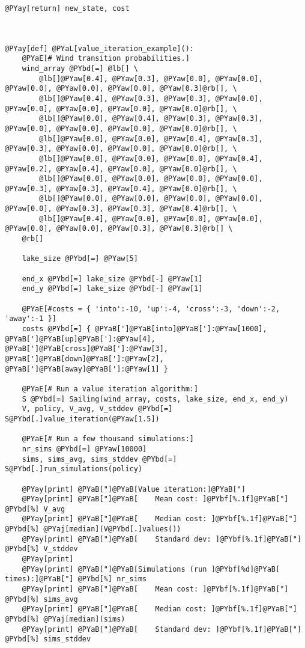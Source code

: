 \begin{Verbatim}[commandchars=@\[\]]
        @PYay[return] new_state, cost



@PYay[def] @PYaL[value_iteration_example]():
    @PYaE[# Wind transition probabilities.]
    wind_array @PYbd[=] @lb[] \
        @lb[]@PYaw[0.4], @PYaw[0.3], @PYaw[0.0], @PYaw[0.0], @PYaw[0.0], @PYaw[0.0], @PYaw[0.0], @PYaw[0.3]@rb[], \
        @lb[]@PYaw[0.4], @PYaw[0.3], @PYaw[0.3], @PYaw[0.0], @PYaw[0.0], @PYaw[0.0], @PYaw[0.0], @PYaw[0.0]@rb[], \
        @lb[]@PYaw[0.0], @PYaw[0.4], @PYaw[0.3], @PYaw[0.3], @PYaw[0.0], @PYaw[0.0], @PYaw[0.0], @PYaw[0.0]@rb[], \
        @lb[]@PYaw[0.0], @PYaw[0.0], @PYaw[0.4], @PYaw[0.3], @PYaw[0.3], @PYaw[0.0], @PYaw[0.0], @PYaw[0.0]@rb[], \
        @lb[]@PYaw[0.0], @PYaw[0.0], @PYaw[0.0], @PYaw[0.4], @PYaw[0.2], @PYaw[0.4], @PYaw[0.0], @PYaw[0.0]@rb[], \
        @lb[]@PYaw[0.0], @PYaw[0.0], @PYaw[0.0], @PYaw[0.0], @PYaw[0.3], @PYaw[0.3], @PYaw[0.4], @PYaw[0.0]@rb[], \
        @lb[]@PYaw[0.0], @PYaw[0.0], @PYaw[0.0], @PYaw[0.0], @PYaw[0.0], @PYaw[0.3], @PYaw[0.3], @PYaw[0.4]@rb[], \
        @lb[]@PYaw[0.4], @PYaw[0.0], @PYaw[0.0], @PYaw[0.0], @PYaw[0.0], @PYaw[0.0], @PYaw[0.3], @PYaw[0.3]@rb[] \
    @rb[]

    lake_size @PYbd[=] @PYaw[5]

    end_x @PYbd[=] lake_size @PYbd[-] @PYaw[1]
    end_y @PYbd[=] lake_size @PYbd[-] @PYaw[1]

    @PYaE[#costs = { 'into':-10, 'up':-4, 'cross':-3, 'down':-2, 'away':-1 }]
    costs @PYbd[=] { @PYaB[']@PYaB[into]@PYaB[']:@PYaw[1000], @PYaB[']@PYaB[up]@PYaB[']:@PYaw[4], @PYaB[']@PYaB[cross]@PYaB[']:@PYaw[3], @PYaB[']@PYaB[down]@PYaB[']:@PYaw[2], @PYaB[']@PYaB[away]@PYaB[']:@PYaw[1] }

    @PYaE[# Run a value iteration algorithm:]
    S @PYbd[=] Sailing(wind_array, costs, lake_size, end_x, end_y)
    V, policy, V_avg, V_stddev @PYbd[=] S@PYbd[.]value_iteration(@PYaw[1.5])

    @PYaE[# Run a few thousand simulations:]
    nr_sims @PYbd[=] @PYaw[10000]
    sims, sims_avg, sims_stddev @PYbd[=] S@PYbd[.]run_simulations(policy)

    @PYay[print] @PYaB["]@PYaB[Value iteration:]@PYaB["]
    @PYay[print] @PYaB["]@PYaB[    Mean cost: ]@PYbf[%.1f]@PYaB["] @PYbd[%] V_avg
    @PYay[print] @PYaB["]@PYaB[    Median cost: ]@PYbf[%.1f]@PYaB["] @PYbd[%] @PYaj[median](V@PYbd[.]values())
    @PYay[print] @PYaB["]@PYaB[    Standard dev: ]@PYbf[%.1f]@PYaB["] @PYbd[%] V_stddev
    @PYay[print]
    @PYay[print] @PYaB["]@PYaB[Simulations (run ]@PYbf[%d]@PYaB[ times):]@PYaB["] @PYbd[%] nr_sims
    @PYay[print] @PYaB["]@PYaB[    Mean cost: ]@PYbf[%.1f]@PYaB["] @PYbd[%] sims_avg
    @PYay[print] @PYaB["]@PYaB[    Median cost: ]@PYbf[%.1f]@PYaB["] @PYbd[%] @PYaj[median](sims)
    @PYay[print] @PYaB["]@PYaB[    Standard dev: ]@PYbf[%.1f]@PYaB["] @PYbd[%] sims_stddev


\end{Verbatim}
